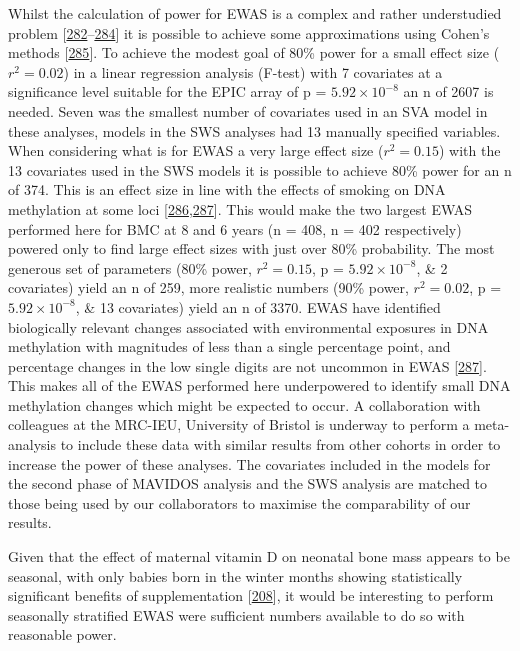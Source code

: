 \documentclass[
]{book}
\begin{document}
Whilst the calculation of power for EWAS is a complex and rather understudied problem {[}\protect\hyperlink{ref-Wang2011}{282}--\protect\hyperlink{ref-Graw2019}{284}{]} it is possible to achieve some approximations using Cohen's methods {[}\protect\hyperlink{ref-Cohen1988}{285}{]}.
To achieve the modest goal of 80\% power for a small effect size (\(r^2 = 0.02\)) in a linear regression analysis (F-test) with 7 covariates at a significance level suitable for the EPIC array of p = \(5.92\times10^{-8}\) an n of 2607 is needed.
Seven was the smallest number of covariates used in an SVA model in these analyses, models in the SWS analyses had 13 manually specified variables.
When considering what is for EWAS a very large effect size (\(r^2 = 0.15\)) with the 13 covariates used in the SWS models it is possible to achieve 80\% power for an n of 374.
This is an effect size in line with the effects of smoking on DNA methylation at some loci {[}\protect\hyperlink{ref-Joubert2016}{286},\protect\hyperlink{ref-Breton2017}{287}{]}.
This would make the two largest EWAS performed here for BMC at 8 and 6 years (n = 408, n = 402 respectively) powered only to find large effect sizes with just over 80\% probability.
The most generous set of parameters (80\% power, \(r^2 = 0.15\), p = \(5.92\times10^{-8}\), \& 2 covariates) yield an n of 259, more realistic numbers (90\% power, \(r^2 = 0.02\), p = \(5.92\times10^{-8}\), \& 13 covariates) yield an n of 3370.
EWAS have identified biologically relevant changes associated with environmental exposures in DNA methylation with magnitudes of less than a single percentage point, and percentage changes in the low single digits are not uncommon in EWAS {[}\protect\hyperlink{ref-Breton2017}{287}{]}.
This makes all of the EWAS performed here underpowered to identify small DNA methylation changes which might be expected to occur.
A collaboration with colleagues at the MRC-IEU, University of Bristol is underway to perform a meta-analysis to include these data with similar results from other cohorts in order to increase the power of these analyses.
The covariates included in the models for the second phase of MAVIDOS analysis and the SWS analysis are matched to those being used by our collaborators to maximise the comparability of our results.

Given that the effect of maternal vitamin D on neonatal bone mass appears to be seasonal, with only babies born in the winter months showing statistically significant benefits of supplementation {[}\protect\hyperlink{ref-Cooper2016}{208}{]}, it would be interesting to perform seasonally stratified EWAS were sufficient numbers available to do so with reasonable power.
\end{document}
